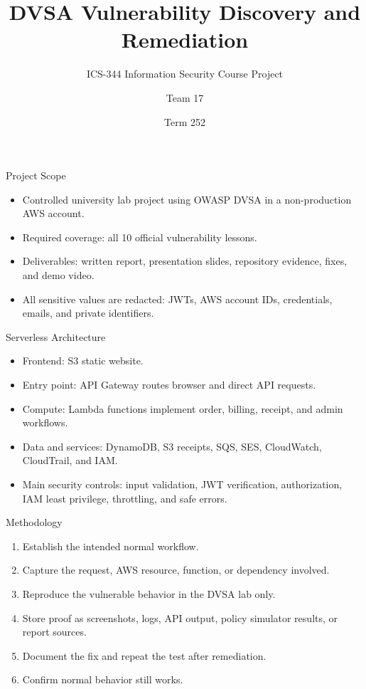 \documentclass[aspectratio=169,11pt]{beamer}
\title{DVSA Vulnerability Discovery and Remediation}
\subtitle{ICS-344 Information Security Course Project}
\author{Team 17}
\institute{King Fahd University of Petroleum and Minerals}
\date{Term 252}
\begin{document}
\begin{frame}
  \titlepage
\end{frame}

\begin{frame}{Project Scope}
  \begin{itemize}
    \item Controlled university lab project using OWASP DVSA in a non-production AWS account.
    \item Required coverage: all 10 official vulnerability lessons.
    \item Deliverables: written report, presentation slides, repository evidence, fixes, and demo video.
    \item All sensitive values are redacted: JWTs, AWS account IDs, credentials, emails, and private identifiers.
  \end{itemize}
\end{frame}

\begin{frame}{Serverless Architecture}
  \begin{itemize}
    \item Frontend: S3 static website.
    \item Entry point: API Gateway routes browser and direct API requests.
    \item Compute: Lambda functions implement order, billing, receipt, and admin workflows.
    \item Data and services: DynamoDB, S3 receipts, SQS, SES, CloudWatch, CloudTrail, and IAM.
    \item Main security controls: input validation, JWT verification, authorization, IAM least privilege, throttling, and safe errors.
  \end{itemize}
\end{frame}

\begin{frame}{Methodology}
  \begin{enumerate}
    \item Establish the intended normal workflow.
    \item Capture the request, AWS resource, function, or dependency involved.
    \item Reproduce the vulnerable behavior in the DVSA lab only.
    \item Store proof as screenshots, logs, API output, policy simulator results, or report sources.
    \item Document the fix and repeat the test after remediation.
    \item Confirm normal behavior still works.
  \end{enumerate}
\end{frame}
\end{document}
